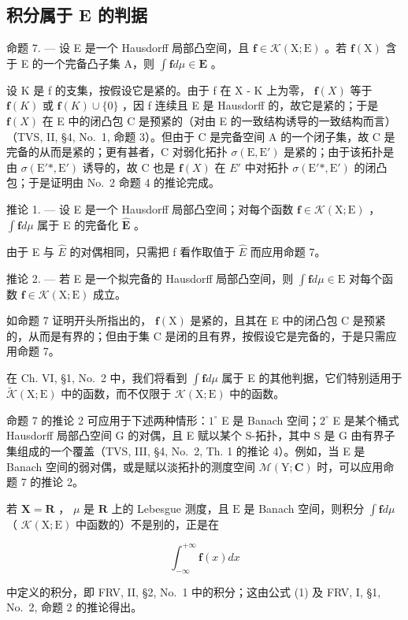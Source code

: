 \subsection{积分属于 E 的判据}

命题 7. --- 设 E 是一个 Hausdorff 局部凸空间，且 \(\mathbf{f} \in \mathcal{K}(\mathrm{X};\mathrm{E})\) 。若 \(\mathbf{f}(\mathrm{X})\) 含于 E 的一个完备凸子集 A，则 \(\int \mathbf{f} d\mu \in \mathbf{E}\) 。

设 K 是 f 的支集，按假设它是紧的。由于 f 在 X - K 上为零， \(\mathbf{f}(X)\) 等于 \(\mathbf{f}(K)\) 或 \(\mathbf{f}(K) \cup \{0\}\) ，因 f 连续且 E 是 Hausdorff 的，故它是紧的；于是 \(\mathbf{f}(X)\) 在 E 中的闭凸包 C 是预紧的（对由 E 的一致结构诱导的一致结构而言）（TVS, II, §4, No.~1, 命题 3）。但由于 C 是完备空间 A 的一个闭子集，故 C 是完备的从而是紧的；更有甚者，C 对弱化拓扑 \(\sigma(\mathrm{E}, \mathrm{E}')\) 是紧的；由于该拓扑是由 \(\sigma(\mathrm{E}'*, \mathrm{E}')\) 诱导的，故 C 也是 \(\mathbf{f}(X)\) 在 \(E'\) 中对拓扑 \(\sigma(\mathrm{E}'*, \mathrm{E}')\) 的闭凸包；于是证明由 No.~2 命题 4 的推论完成。

推论 1. --- 设 E 是一个 Hausdorff 局部凸空间；对每个函数 \(\mathbf{f} \in \mathcal{K}(\mathrm{X};\mathrm{E})\) ， \(\int \mathbf{f} d\mu\) 属于 E 的完备化 \(\widehat{\mathbf{E}}\) 。

由于 E 与 \(\widehat{E}\) 的对偶相同，只需把 f 看作取值于 \(\widehat{E}\) 而应用命题 7。

推论 2. --- 若 E 是一个拟完备的 Hausdorff 局部凸空间，则 \(\int \mathbf{f} d\mu \in \mathrm{E}\) 对每个函数 \(\mathbf{f} \in \mathcal{K}(\mathrm{X};\mathrm{E})\) 成立。

如命题 7 证明开头所指出的， \(\mathbf{f}(\mathrm{X})\) 是紧的，且其在 E 中的闭凸包 C 是预紧的，从而是有界的；但由于集 C 是闭的且有界，按假设它是完备的，于是只需应用命题 7。

在 Ch. VI, §1, No.~2 中，我们将看到 \(\int \mathbf{f} d\mu\) 属于 E 的其他判据，它们特别适用于 \(\widetilde{\mathcal{K}}(\mathrm{X};\mathrm{E})\) 中的函数，而不仅限于 \(\mathcal{K}(\mathrm{X};\mathrm{E})\) 中的函数。

命题 7 的推论 2 可应用于下述两种情形：\(1^{\circ}\) E 是 Banach 空间；\(2^{\circ}\) E 是某个桶式 Hausdorff 局部凸空间 G 的对偶，且 E 赋以某个 S-拓扑，其中 S 是 G 由有界子集组成的一个覆盖（TVS, III, §4, No.~2, Th. 1 的推论 4）。例如，当 E 是 Banach 空间的弱对偶，或是赋以淡拓扑的测度空间 \(\mathcal{M}(\mathrm{Y};\mathbf{C})\) 时，可以应用命题 7 的推论 2。

若 \(\mathbf{X} = \mathbf{R}\) ， \(\mu\) 是 \(\mathbf{R}\) 上的 Lebesgue 测度，且 \(\mathrm{E}\) 是 Banach 空间，则积分 \(\int \mathbf{f} d\mu\) （ \(\mathcal{K}(\mathrm{X};\mathrm{E})\) 中函数的）不是别的，正是在

\[
\int_ {- \infty} ^ {+ \infty} \mathbf {f} (x) d x
\]

中定义的积分，即 FRV, II, §2, No.~1 中的积分；这由公式 (1) 及 FRV, I, §1, No.~2, 命题 2 的推论得出。

